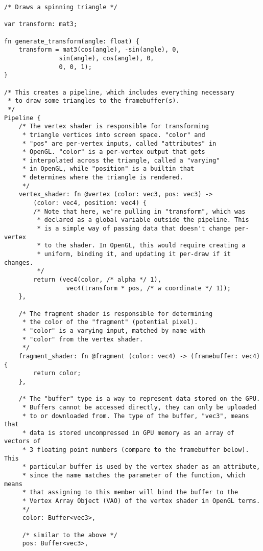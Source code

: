 \documentclass[11pt]{article}
\begin{document}
\begin{lstlisting}
/* Draws a spinning triangle */

var transform: mat3;

fn generate_transform(angle: float) {
    transform = mat3(cos(angle), -sin(angle), 0,
               sin(angle), cos(angle), 0,
               0, 0, 1);
}

/* This creates a pipeline, which includes everything necessary
 * to draw some triangles to the framebuffer(s).
 */
Pipeline {
    /* The vertex shader is responsible for transforming
     * triangle vertices into screen space. "color" and
     * "pos" are per-vertex inputs, called "attributes" in
     * OpenGL. "color" is a per-vertex output that gets
     * interpolated across the triangle, called a "varying"
     * in OpenGL, while "position" is a builtin that 
     * determines where the triangle is rendered.
     */
    vertex_shader: fn @vertex (color: vec3, pos: vec3) ->
    	(color: vec4, position: vec4) {
    	/* Note that here, we're pulling in "transform", which was
    	 * declared as a global variable outside the pipeline. This
    	 * is a simple way of passing data that doesn't change per-vertex
    	 * to the shader. In OpenGL, this would require creating a
    	 * uniform, binding it, and updating it per-draw if it changes.
    	 */
        return (vec4(color, /* alpha */ 1),
   				 vec4(transform * pos, /* w coordinate */ 1));
    },

    /* The fragment shader is responsible for determining
     * the color of the "fragment" (potential pixel).
     * "color" is a varying input, matched by name with
     * "color" from the vertex shader.
     */
    fragment_shader: fn @fragment (color: vec4) -> (framebuffer: vec4) {
        return color;
    },
    
    /* The "buffer" type is a way to represent data stored on the GPU.
     * Buffers cannot be accessed directly, they can only be uploaded
     * to or downloaded from. The type of the buffer, "vec3", means that
     * data is stored uncompressed in GPU memory as an array of vectors of
     * 3 floating point numbers (compare to the framebuffer below). This
     * particular buffer is used by the vertex shader as an attribute,
     * since the name matches the parameter of the function, which means
     * that assigning to this member will bind the buffer to the
     * Vertex Array Object (VAO) of the vertex shader in OpenGL terms.
     */
     color: Buffer<vec3>,
     
     /* similar to the above */
     pos: Buffer<vec3>,
    

\end{lstlisting}
\end{document}
